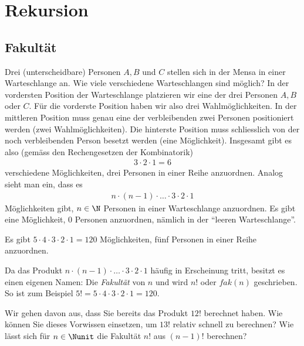 \chapter{Rekursion}\label{ch:Kapitel03}

\section{Fakultät}\label{sec:fakultaet}
Drei (unterscheidbare) Personen $A, B$ und $C$ stellen sich in der Mensa in einer Warteschlange an. Wie viele verschiedene Warteschlangen sind möglich? In der vordersten Position der Warteschlange platzieren wir eine der drei Personen $A, B$ oder $C$. Für die vorderste Position haben wir also drei Wahlmöglichkeiten. In der mittleren Position muss genau eine der verbleibenden zwei Personen positioniert werden (zwei Wahlmöglichkeiten). Die hinterste Position muss schliesslich von der noch verbleibenden Person besetzt werden (eine Möglichkeit). Insgesamt gibt es also (gemäss den Rechengesetzen der Kombinatorik)
\begin{align*}
    3\cdot 2\cdot 1 = 6
\end{align*}
verschiedene Möglichkeiten, drei Personen in einer Reihe anzuordnen. Analog sieht man ein, dass es
\begin{align*}
    n\cdot (n-1)\cdot\ldots\cdot 3\cdot 2\cdot 1
\end{align*}
Möglichkeiten gibt, $n\in\N$ Personen in einer Warteschlange anzuordnen. Es gibt eine Möglichkeit, $0$ Personen anzuordnen, nämlich in der \enquote{leeren Warteschlange}.
\begin{myexample}
Es gibt $5\cdot 4\cdot 3\cdot 2\cdot 1 = 120$ Möglichkeiten, fünf Personen in einer Reihe anzuordnen.
\end{myexample}

Da das Produkt $n\cdot (n-1)\cdot\ldots\cdot 3\cdot 2\cdot 1$ häufig in Erscheinung tritt, besitzt es einen eigenen Namen: Die \textit{Fakultät} von $n$ und wird $n!$ oder $fak(n)$ geschrieben. So ist zum Beispiel $5! = 5\cdot 4\cdot 3\cdot 2\cdot 1 = 120$.

\begin{myexercise}\label{myexercise:0301}
Wir gehen davon aus, dass Sie bereits das Produkt $12!$  berechnet haben. Wie können Sie dieses Vorwissen einsetzen, um $13!$ relativ schnell zu berechnen? Wie lässt sich für $n\in\Nunit$ die Fakultät $n!$ aus $(n-1)!$ berechnen?
\end{myexercise}

